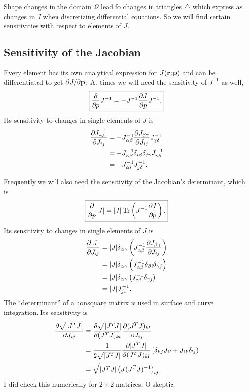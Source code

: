 Shape changes in the domain $\Omega$ lead fo changes in triangles $\bigtriangleup$ which express as changes in $J$ when discretizing differential equations.  So we will find certain sensitivities with respect to elements of $J$.

\subsection{Sensitivity of the Jacobian}

Every element has its own analytical expression for $J(\textbf{r}; \textbf{p})$ and can be differentiated to get $\partial{J}/\partial{\textbf{p}}$.  At times we will need the sensitivity of $J^{-1}$ as well,
%
\begin{equation}
\boxed{
\frac{\partial{}}{\partial{p}} J^{-1} = - J^{-1} \frac{\partial{J}}{\partial{p}} J^{-1}.
}
\end{equation}
%
Its sensitivity to changes in single elements of $J$ is
%
\begin{equation}
\label{eqn:jacobian_jacobian_sensitivity}
\begin{aligned}
\frac{\partial{J^{-1}_{\alpha \delta}}}{\partial{J_{ij}}} &= -J^{-1}_{\alpha \beta} \frac{\partial{J_{\beta \gamma}}}{\partial{J_{ij}}} J^{-1}_{\gamma \delta} \\
&= -J^{-1}_{\alpha \beta} \delta_{i \beta} \delta_{j \gamma} J^{-1}_{\gamma \delta} \\
&= -J^{-1}_{\alpha i} J^{-1}_{j \delta}.
\end{aligned}
\end{equation}

%
Frequently we will also need the sensitivity of the Jacobian's determinant, which is
%
\begin{equation}
\label{eqn:jacobian_determinant_sensitivity}
\boxed{
\frac{\partial{}}{\partial{p}} |J| = |J| \operatorname{Tr} \left( J^{-1} \frac{\partial{J}}{\partial{p}} \right).
}
\end{equation}
%
Its sensitivity to changes in single elements of $J$ is
%
\begin{equation}
\begin{aligned}
\frac{\partial{|J|}}{\partial{J_{i j}}} &= |J| \delta_{\alpha \gamma} \left(  J^{-1}_{\alpha \beta} \frac{\partial{J_{\beta \gamma}}}{\partial{J_{i j}}} \right) \\
&= |J| \delta_{\alpha \gamma} \left( J^{-1}_{\alpha \beta} \delta_{\beta i} \delta_{\gamma j} \right) \\
&= |J| \delta_{\alpha \gamma} \left( J^{-1}_{\alpha i} \delta_{\gamma j} \right) \\
&= |J| J^{-1}_{ji}.
\end{aligned}
\end{equation}
%
The ``determinant'' of a nonsquare matrix is used in surface and curve integration.  Its sensitivity is
%
\begin{equation}
\begin{aligned}
\frac{\partial{\sqrt{| J^T J |}}}{\partial{J_{ij}}} &= \frac{\partial{\sqrt{|J^T J|}}}{\partial{(J^TJ)_{kl}}} \frac{\partial{(J^TJ)_{kl}}}{\partial{J_{ij}}} \\
&= \frac{1}{2\sqrt{|J^TJ|}} \frac{\partial{|J^T J|}}{\partial{(J^TJ)_{kl}}} \left( \delta_{k j} J_{i l} + J_{i k} \delta_{l j} \right) \\
&= \sqrt{|J^TJ|} \left( J (J^T J)^{-1} \right)_{ij}.
\end{aligned}
\end{equation}
%
I did check this numerically for $2 \times 2$ matrices, O skeptic.


